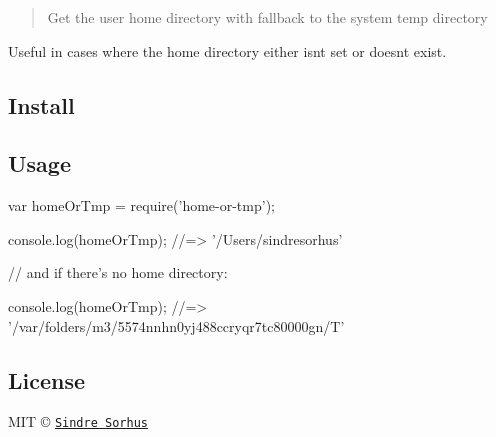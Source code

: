 \begin{quote}
Get the user home directory with fallback to the system temp directory \end{quote}


Useful in cases where the home directory either isn\textquotesingle{}t set or doesn\textquotesingle{}t exist.

\subsection*{Install}




\subsection*{Usage}


\begin{DoxyCode}
var homeOrTmp = require('home-or-tmp');

console.log(homeOrTmp);
//=> '/Users/sindresorhus'

// and if there's no home directory:

console.log(homeOrTmp);
//=> '/var/folders/m3/5574nnhn0yj488ccryqr7tc80000gn/T'
\end{DoxyCode}


\subsection*{License}

M\+IT © \href{http://sindresorhus.com}{\tt Sindre Sorhus} 